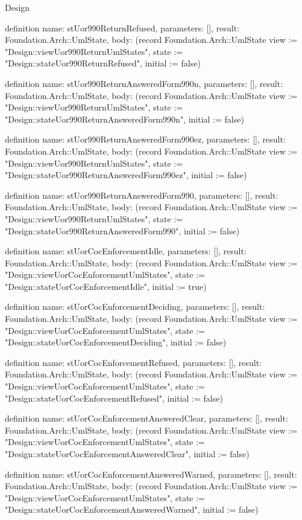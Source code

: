 \begin{lexlean}{Design}
\begin{semanticmodule}
definition{
  name: stUor990ReturnRefused,
  parameters: [],
  result: Foundation.Arch::UmlState,
  body: (record Foundation.Arch::UmlState {view := "Design::viewUor990ReturnUmlStates", state := "Design::stateUor990ReturnRefused", initial := false})
}

definition{
  name: stUor990ReturnAnsweredForm990n,
  parameters: [],
  result: Foundation.Arch::UmlState,
  body: (record Foundation.Arch::UmlState {view := "Design::viewUor990ReturnUmlStates", state := "Design::stateUor990ReturnAnsweredForm990n", initial := false})
}

definition{
  name: stUor990ReturnAnsweredForm990ez,
  parameters: [],
  result: Foundation.Arch::UmlState,
  body: (record Foundation.Arch::UmlState {view := "Design::viewUor990ReturnUmlStates", state := "Design::stateUor990ReturnAnsweredForm990ez", initial := false})
}

definition{
  name: stUor990ReturnAnsweredForm990,
  parameters: [],
  result: Foundation.Arch::UmlState,
  body: (record Foundation.Arch::UmlState {view := "Design::viewUor990ReturnUmlStates", state := "Design::stateUor990ReturnAnsweredForm990", initial := false})
}

definition{
  name: stUorCocEnforcementIdle,
  parameters: [],
  result: Foundation.Arch::UmlState,
  body: (record Foundation.Arch::UmlState {view := "Design::viewUorCocEnforcementUmlStates", state := "Design::stateUorCocEnforcementIdle", initial := true})
}

definition{
  name: stUorCocEnforcementDeciding,
  parameters: [],
  result: Foundation.Arch::UmlState,
  body: (record Foundation.Arch::UmlState {view := "Design::viewUorCocEnforcementUmlStates", state := "Design::stateUorCocEnforcementDeciding", initial := false})
}

definition{
  name: stUorCocEnforcementRefused,
  parameters: [],
  result: Foundation.Arch::UmlState,
  body: (record Foundation.Arch::UmlState {view := "Design::viewUorCocEnforcementUmlStates", state := "Design::stateUorCocEnforcementRefused", initial := false})
}

definition{
  name: stUorCocEnforcementAnsweredClear,
  parameters: [],
  result: Foundation.Arch::UmlState,
  body: (record Foundation.Arch::UmlState {view := "Design::viewUorCocEnforcementUmlStates", state := "Design::stateUorCocEnforcementAnsweredClear", initial := false})
}

definition{
  name: stUorCocEnforcementAnsweredWarned,
  parameters: [],
  result: Foundation.Arch::UmlState,
  body: (record Foundation.Arch::UmlState {view := "Design::viewUorCocEnforcementUmlStates", state := "Design::stateUorCocEnforcementAnsweredWarned", initial := false})
}


\end{semanticmodule}
\end{lexlean}
